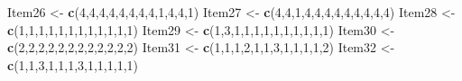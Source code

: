 \documentclass[
  english,
]{book}
\newenvironment{Shaded}{\begin{snugshade}}{\end{snugshade}}
\newcommand{\DecValTok}[1]{\textcolor[rgb]{0.00,0.00,0.81}{#1}}
\newcommand{\KeywordTok}[1]{\textcolor[rgb]{0.13,0.29,0.53}{\textbf{#1}}}
\newcommand{\NormalTok}[1]{#1}
\newcommand{\StringTok}[1]{\textcolor[rgb]{0.31,0.60,0.02}{#1}}
\begin{document}
\begin{Shaded}
\begin{Highlighting}[]
\NormalTok{Item26 <-}\StringTok{ }\KeywordTok{c}\NormalTok{(}\DecValTok{4}\NormalTok{,}\DecValTok{4}\NormalTok{,}\DecValTok{4}\NormalTok{,}\DecValTok{4}\NormalTok{,}\DecValTok{4}\NormalTok{,}\DecValTok{4}\NormalTok{,}\DecValTok{4}\NormalTok{,}\DecValTok{4}\NormalTok{,}\DecValTok{1}\NormalTok{,}\DecValTok{4}\NormalTok{,}\DecValTok{4}\NormalTok{,}\DecValTok{1}\NormalTok{)}
\NormalTok{Item27 <-}\StringTok{ }\KeywordTok{c}\NormalTok{(}\DecValTok{4}\NormalTok{,}\DecValTok{4}\NormalTok{,}\DecValTok{1}\NormalTok{,}\DecValTok{4}\NormalTok{,}\DecValTok{4}\NormalTok{,}\DecValTok{4}\NormalTok{,}\DecValTok{4}\NormalTok{,}\DecValTok{4}\NormalTok{,}\DecValTok{4}\NormalTok{,}\DecValTok{4}\NormalTok{,}\DecValTok{4}\NormalTok{,}\DecValTok{4}\NormalTok{)}
\NormalTok{Item28 <-}\StringTok{ }\KeywordTok{c}\NormalTok{(}\DecValTok{1}\NormalTok{,}\DecValTok{1}\NormalTok{,}\DecValTok{1}\NormalTok{,}\DecValTok{1}\NormalTok{,}\DecValTok{1}\NormalTok{,}\DecValTok{1}\NormalTok{,}\DecValTok{1}\NormalTok{,}\DecValTok{1}\NormalTok{,}\DecValTok{1}\NormalTok{,}\DecValTok{1}\NormalTok{,}\DecValTok{1}\NormalTok{,}\DecValTok{1}\NormalTok{)}
\NormalTok{Item29 <-}\StringTok{ }\KeywordTok{c}\NormalTok{(}\DecValTok{1}\NormalTok{,}\DecValTok{3}\NormalTok{,}\DecValTok{1}\NormalTok{,}\DecValTok{1}\NormalTok{,}\DecValTok{1}\NormalTok{,}\DecValTok{1}\NormalTok{,}\DecValTok{1}\NormalTok{,}\DecValTok{1}\NormalTok{,}\DecValTok{1}\NormalTok{,}\DecValTok{1}\NormalTok{,}\DecValTok{1}\NormalTok{,}\DecValTok{1}\NormalTok{)}
\NormalTok{Item30 <-}\StringTok{ }\KeywordTok{c}\NormalTok{(}\DecValTok{2}\NormalTok{,}\DecValTok{2}\NormalTok{,}\DecValTok{2}\NormalTok{,}\DecValTok{2}\NormalTok{,}\DecValTok{2}\NormalTok{,}\DecValTok{2}\NormalTok{,}\DecValTok{2}\NormalTok{,}\DecValTok{2}\NormalTok{,}\DecValTok{2}\NormalTok{,}\DecValTok{2}\NormalTok{,}\DecValTok{2}\NormalTok{,}\DecValTok{2}\NormalTok{)}
\NormalTok{Item31 <-}\StringTok{ }\KeywordTok{c}\NormalTok{(}\DecValTok{1}\NormalTok{,}\DecValTok{1}\NormalTok{,}\DecValTok{1}\NormalTok{,}\DecValTok{2}\NormalTok{,}\DecValTok{1}\NormalTok{,}\DecValTok{1}\NormalTok{,}\DecValTok{3}\NormalTok{,}\DecValTok{1}\NormalTok{,}\DecValTok{1}\NormalTok{,}\DecValTok{1}\NormalTok{,}\DecValTok{1}\NormalTok{,}\DecValTok{2}\NormalTok{)}
\NormalTok{Item32 <-}\StringTok{ }\KeywordTok{c}\NormalTok{(}\DecValTok{1}\NormalTok{,}\DecValTok{1}\NormalTok{,}\DecValTok{3}\NormalTok{,}\DecValTok{1}\NormalTok{,}\DecValTok{1}\NormalTok{,}\DecValTok{1}\NormalTok{,}\DecValTok{3}\NormalTok{,}\DecValTok{1}\NormalTok{,}\DecValTok{1}\NormalTok{,}\DecValTok{1}\NormalTok{,}\DecValTok{1}\NormalTok{,}\DecValTok{1}\NormalTok{)}

\end{Highlighting}
\end{Shaded}
\end{document}
